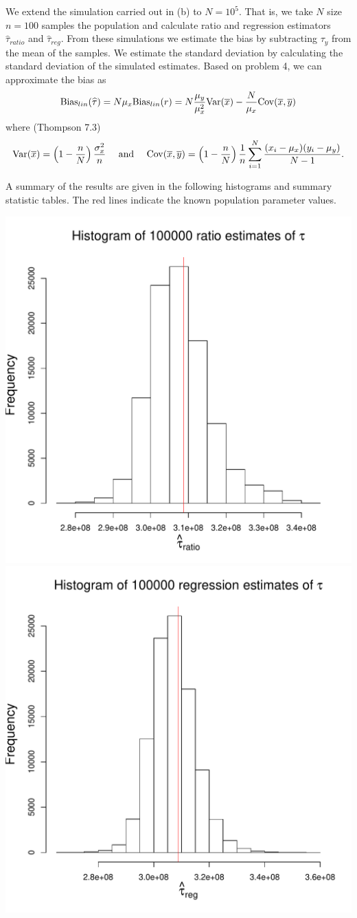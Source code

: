 \documentclass{homework}
\begin{document}

\begin{solution}
We extend the simulation carried out in (b) to $N=10^5$.  That is, we take $N$ size $n=100$ samples the population and calculate ratio and regression estimators $\hat\tau_{ratio}$ and $\hat\tau_{reg}$.  From these simulations we estimate the bias by subtracting $\tau_y$ from the mean of the samples.  We estimate the standard deviation by calculating the standard deviation of the simulated estimates. Based on problem 4, we can approximate the bias as
$$
  \mathrm{Bias}_{lin}(\widehat\tau) = N\mu_x \mathrm{Bias}_{lin}(r) = N\frac{\mu_y}{\mu_x^2} \mathrm{Var}(\overline x)- \frac{N}{\mu_x} \mathrm{Cov}(\overline x, \overline y)
$$ 
where (Thompson 7.3)
$$
  \mathrm{Var}(\overline x) = \left(1-\frac nN\right)\frac{\sigma^2_x}{n} \quad\text{ and }\quad \mathrm{Cov}(\overline x,\overline y) = \left(1-\frac nN\right) \frac1n \sum_{i=1}^N \frac{(x_i-\mu_x)(y_i-\mu_y)}{N-1}.
$$

A summary of the results are given in the following histograms and summary statistic tables.
The red lines indicate the known population parameter values.

  \includegraphics[width=.45\textwidth]{ratio_hist_big.pdf}
  \includegraphics[width=.45\textwidth]{regression_hist_big.pdf}



\end{solution}
\end{document}
